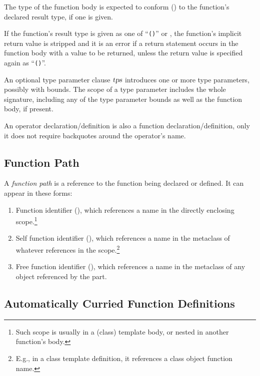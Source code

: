 The type of the function body is expected to conform () to the function's declared result type, if one is given. 

If the function's result type is given as one of ``\lstinline!()!'' or , the function's implicit return value is stripped and it is an error if a return statement occurs in the function body with a value to be returned, unless the return value is specified again as ``\lstinline!()!''.

An optional type parameter clause $\mbox{\sl tps}$ introduces one or more type parameters, possibly with bounds. The scope of a type parameter includes the whole signature, including any of the type parameter bounds as well as the function body, if present. 

An operator declaration/definition is also a function declaration/definition, only it does not require backquotes around the operator's name. 





\subsection{Function Path}

A {\em function path} is a reference to the function being declared or defined. It can appear in these forms:

\begin{enumerate}
  \item Function identifier (), which references a name in the directly enclosing scope.\footnote{Such scope is usually in a (class) template body, or nested in another function's body.}
  \item Self function identifier (), which references a name in the metaclass of whatever  references in the scope.\footnote{E.g., in a class template definition, it references a class object function name.} 
  \item Free function identifier (), which references a name in the metaclass of any object referenced by the  part.
\end{enumerate}





\subsection{Automatically Curried Function Definitions}

